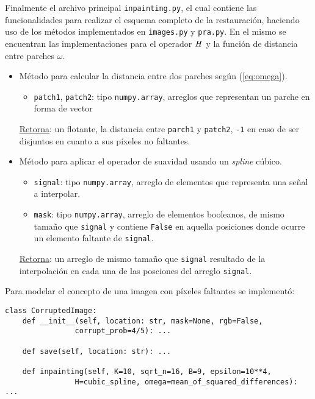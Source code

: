 Finalmente el archivo principal \texttt{inpainting.py}, el cual contiene las funcionalidades para realizar el esquema completo de la restauraci\'on, haciendo uso de los m\'etodos implementados en \texttt{images.py} y \texttt{pra.py}. En el mismo se encuentran las implementaciones para el operador $\mathit{H}$ y la funci\'on de distancia entre parches $\omega$.
\begin{itemize}
	\item M\'etodo para calcular la distancia entre dos parches seg\'un (\ref{eq:omega}).
	
	\begin{itemize}
		\item \texttt{patch1}, \texttt{patch2}: tipo \texttt{numpy.array}, arreglos que representan un parche en forma de vector
	\end{itemize}
	\underline{Retorna}: un flotante, la distancia entre \texttt{parch1} y \texttt{patch2}, \texttt{-1} en caso de ser disjuntos en cuanto a sus p\'ixeles no faltantes.
	
	\item M\'etodo para aplicar el operador de suavidad usando un \textit{spline} c\'ubico.
	
	\begin{itemize}
		\item \texttt{signal}: tipo \texttt{numpy.array}, arreglo de elementos que representa una señal a interpolar.
		\item \texttt{mask}: tipo \texttt{numpy.array}, arreglo de elementos booleanos, de mismo tamaño que \texttt{signal} y contiene \texttt{False} en aquella posiciones donde ocurre un elemento faltante de \texttt{signal}.
	\end{itemize}
	\underline{Retorna}: un arreglo de mismo tamaño que \texttt{signal} resultado de la interpolaci\'on en cada una de las posciones del arreglo \texttt{signal}.
\end{itemize}
Para modelar el concepto de una imagen con p\'ixeles faltantes se implement\'o:
\begin{lstlisting}
class CorruptedImage:
	def __init__(self, location: str, mask=None, rgb=False, 
				corrupt_prob=4/5): ...
	
	def save(self, location: str): ...
	
	def inpainting(self, K=10, sqrt_n=16, B=9, epsilon=10**4,
				H=cubic_spline, omega=mean_of_squared_differences): ...
\end{lstlisting}

